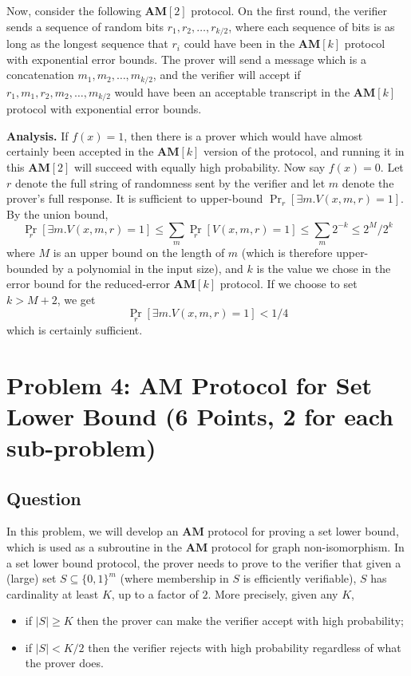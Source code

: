 \documentclass{article}
\newcommand{\AM}{\mathbf{AM}}
\begin{document}
Now, consider the following $\AM[2]$ protocol.  On the first round,
the verifier sends a sequence of random bits $r_1, r_2, \dots, r_{k/2}$,
where each sequence of bits is as long as the longest sequence that $r_i$ could have been in the $\AM[k]$ protocol with exponential error bounds.
The prover will send a message which is a concatenation $m_1, m_2, \dots, m_{k/2}$, and the verifier will accept if $r_1, m_1, r_2, m_2, \dots, m_{k/2}$ would have been an acceptable transcript in the $\AM[k]$ protocol with exponential error bounds.

\medskip
\noindent \textbf{Analysis.} If $f(x) = 1$, then there is a prover which would have almost certainly been accepted in the $\AM[k]$ version of the protocol, and running it in this $\AM[2]$ will succeed with equally high probability.
Now say $f(x) = 0$.  Let $r$ denote the full string of randomness sent by the verifier and let $m$ denote the prover's full response.
It is sufficient to upper-bound $\Pr_r[\exists m . V(x, m, r) = 1]$.
By the union bound,
$$
\Pr_r[\exists m . V(x, m, r) = 1] \leq \sum_{m}{\Pr_r[V(x, m, r) = 1]} \leq \sum_m{2^{-k}} \leq 2^M/2^k
$$
where $M$ is an upper bound on the length of $m$
(which is therefore upper-bounded by a polynomial in the input size), and $k$ is the value we chose in the error bound for the reduced-error $\AM[k]$ protocol.
If we choose to set $k > M + 2$, we get 
$$
\Pr_r[\exists m . V(x, m, r) = 1] < 1/4
$$
which is certainly sufficient.


\newpage

\section*{Problem 4: AM Protocol for Set Lower Bound (6 Points, 2 for each sub-problem)}

\subsection*{Question}

In this problem, we will develop an $\AM$ protocol for proving a set lower bound, which is used as a subroutine in the $\AM$ protocol for graph non-isomorphism. In a set lower bound protocol, the prover needs to prove to the verifier that given a (large) set $S\subseteq \{0,1\}^m$ (where membership in $S$ is efficiently verifiable), $S$ has cardinality at least $K$, up to a factor of $2$. More precisely, given any $K$,
\begin{itemize}
\item  if $|S| \ge K$ then the prover can make the verifier accept with high probability; 
\item if $|S| < K/2$ then the verifier rejects with high probability regardless of what the prover does.
\end{itemize}
\end{document}
